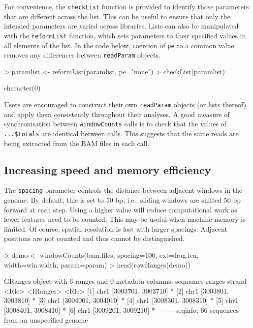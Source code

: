 \documentclass[12pt]{report}
\renewenvironment{Schunk}{\vspace{0pt}}{\vspace{0pt}}
\newcommand{\code}[1]{{\small\texttt{#1}}}
\begin{document}
For convenience, the \code{checkList} function is provided to identify those parameters that are different across the list.
This can be useful to ensure that only the intended parameters are varied across libraries.
Lists can also be manipulated with the \code{reformList} function, which sets parameters to their specified values in all elements of the list.
In the code below, coercion of \code{pe} to a common value removes any differences between \code{readParam} objects.

\begin{Schunk}
\begin{Sinput}
> paramlist <- reformList(paramlist, pe="none")
> checkList(paramlist)
\end{Sinput}
\begin{Soutput}
character(0)
\end{Soutput}
\end{Schunk}

Users are encouraged to construct their own \code{readParam} objects (or lists thereof) and apply them consistently throughout their analyses.
A good measure of synchronisation between \code{windowCounts} calls is to check that the values of \code{...\$totals} are identical between calls. 
This suggests that the same reads are being extracted from the BAM files in each call. 

\subsection{Increasing speed and memory efficiency}
\label{sec:efficiency}
The \code{spacing} parameter controls the distance between adjacent windows in the genome.
By default, this is set to 50 bp, i.e., sliding windows are shifted 50 bp forward at each step.
Using a higher value will reduce computational work as fewer features need to be counted.
This may be useful when machine memory is limited. 
Of course, spatial resolution is lost with larger spacings.
Adjacent positions are not counted and thus cannot be distinguished. 

\begin{Schunk}
\begin{Sinput}
> demo <- windowCounts(bam.files, spacing=100, ext=frag.len, width=win.width, param=param)
> head(rowRanges(demo))
\end{Sinput}
\begin{Soutput}
GRanges object with 6 ranges and 0 metadata columns:
      seqnames             ranges strand
         <Rle>          <IRanges>  <Rle>
  [1]     chr1 [3003701, 3003710]      *
  [2]     chr1 [3003801, 3003810]      *
  [3]     chr1 [3004001, 3004010]      *
  [4]     chr1 [3008301, 3008310]      *
  [5]     chr1 [3008401, 3008410]      *
  [6]     chr1 [3009201, 3009210]      *
  -------
  seqinfo: 66 sequences from an unspecified genome
\end{Soutput}
\end{Schunk}
\end{document}
